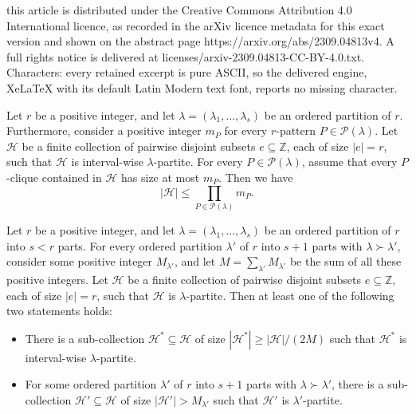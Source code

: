\documentclass[10pt,a4paper]{amsart}
\newcommand{\HH}{\mathcal{H}}
\newcommand{\PP}{\mathcal{P}}
\newcommand{\Z}{\mathbb{Z}}
\newcommand{\su}{\subseteq}
\begin{document}
this article is distributed under the Creative Commons Attribution 4.0 International licence, as recorded in the arXiv licence metadata for this exact version and shown on the abstract page https://arxiv.org/abs/2309.04813v4. A full rights notice is delivered at licenses/arxiv-2309.04813-CC-BY-4.0.txt. Characters: every retained excerpt is pure ASCII, so the delivered engine, XeLaTeX with its default Latin Modern text font, reports no missing character.
\begin{lemma}\label{obs-interval-wise}
Let $r$ be a positive integer, and let $\lambda=(\lambda_1,\dots,\lambda_s)$ be an ordered partition of $r$. Furthermore, consider a positive integer $m_P$ for every $r$-pattern $P\in \PP(\lambda)$. Let $\HH$ be a finite collection of pairwise disjoint subsets $e\su \Z$, each of size $|e|=r$, such that $\HH$ is interval-wise $\lambda$-partite. For every $P\in \PP(\lambda)$, assume that every $P$-clique contained in $\HH$ has size at most $m_{P}$. Then we have
\[|\HH|\le \prod_{P\in \PP(\lambda)} m_{P}.\]
\end{lemma}

\begin{proposition}\label{prop-two-options}
Let $r$ be a positive integer, and let $\lambda=(\lambda_1,\dots,\lambda_s)$ be an ordered partition of $r$ into $s<r$ parts. For every ordered partition $\lambda'$ of $r$ into $s+1$ parts with $\lambda\succ\lambda'$, consider some positive integer $M_{\lambda'}$, and let $M=\sum_{\lambda'} M_{\lambda'}$ be the sum of all these positive integers. Let $\HH$ be a finite collection of pairwise disjoint subsets $e\su \Z$, each of size $|e|=r$, such that $\HH$ is $\lambda$-partite. Then at least one of the following two statements holds:
\begin{itemize}
    \item[(a)] There is a sub-collection $\HH^*\su \HH$ of size $|\HH^*|\ge |\HH|/(2M)$ such that $\HH^*$ is interval-wise $\lambda$-partite.
    \item[(b)] For some ordered partition $\lambda'$ of $r$ into $s+1$ parts with $\lambda\succ\lambda'$, there is a sub-collection $\HH'\su \HH$ of size $|\HH'|>M_{\lambda'}$ such that $\HH'$ is $\lambda'$-partite.
\end{itemize}
\end{proposition}
\end{document}

